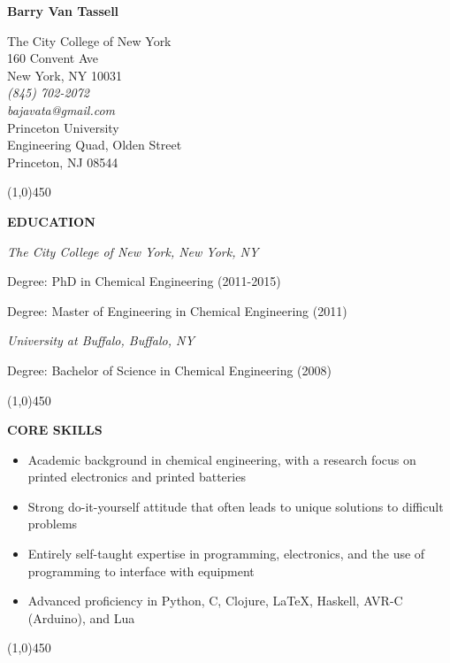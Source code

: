 \documentclass[9pt,letterpaper]{article}
\begin{document}
\begin{center}
  {\LARGE \textbf{Barry Van Tassell}}\\
  \begin{multicols}{3}
    {\small The City College of New York \\
    160 Convent Ave \\
  New York, NY 10031}\\
  \columnbreak
  \emph{\small (845) 702-2072\\
    bajavata@gmail.com}\\
  \columnbreak
    {\small Princeton University \\
    Engineering Quad, Olden Street \\
    Princeton, NJ 08544}
  \end{multicols}
  \line(1,0){450}
\end{center}

\onehalfspacing

{\singlespacing
\noindent \textbf{EDUCATION}
\newline
}
{\small
\indent \emph{The City College of New York, New York, NY}

\indent \indent Degree: PhD in Chemical Engineering (2011-2015)

\indent \indent Degree: Master of Engineering in Chemical Engineering (2011)

\indent \emph{University at Buffalo, Buffalo, NY}

\indent \indent Degree: Bachelor of Science in Chemical Engineering (2008)
\begin{center}
  \line(1,0){450}
\end{center}
}

{\singlespacing
\noindent \textbf{CORE SKILLS}

{\small\begin{itemize}
\item Academic background in chemical engineering, with a research focus on printed electronics and printed batteries
\item Strong do-it-yourself attitude that often leads to unique solutions to difficult problems
\item Entirely self-taught expertise in programming, electronics, and the use of programming to interface with equipment
\item Advanced proficiency in Python, C, Clojure, \LaTeX, Haskell, AVR-C (Arduino), and Lua
\end{itemize}}}

\begin{center}
  \line(1,0){450}
\end{center}
\end{document}
